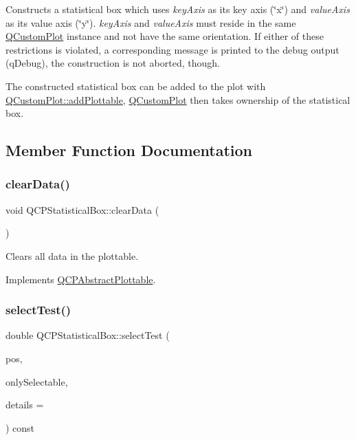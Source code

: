 Constructs a statistical box which uses {\itshape key\+Axis} as its key axis (\char`\"{}x\char`\"{}) and {\itshape value\+Axis} as its value axis (\char`\"{}y\char`\"{}). {\itshape key\+Axis} and {\itshape value\+Axis} must reside in the same \mbox{\hyperlink{class_q_custom_plot}{Q\+Custom\+Plot}} instance and not have the same orientation. If either of these restrictions is violated, a corresponding message is printed to the debug output (q\+Debug), the construction is not aborted, though.

The constructed statistical box can be added to the plot with \mbox{\hyperlink{class_q_custom_plot_ab7ad9174f701f9c6f64e378df77927a6}{Q\+Custom\+Plot\+::add\+Plottable}}, \mbox{\hyperlink{class_q_custom_plot}{Q\+Custom\+Plot}} then takes ownership of the statistical box. 

\subsection{Member Function Documentation}
\mbox{\label{class_q_c_p_statistical_box_a19112994449df0c20287858436cc68e3}} 
\subsubsection{\texorpdfstring{clear\+Data()}{clearData()}}
{\footnotesize\ttfamily void Q\+C\+P\+Statistical\+Box\+::clear\+Data (\begin{DoxyParamCaption}{ }\end{DoxyParamCaption})\hspace{0.3cm}{\ttfamily [virtual]}}

Clears all data in the plottable. 

Implements \mbox{\hyperlink{class_q_c_p_abstract_plottable_a86e5b8fd4b6ff4f4084e7ea4c573fc53}{Q\+C\+P\+Abstract\+Plottable}}.

\mbox{\label{class_q_c_p_statistical_box_a0153ac16326b94450afbca208e3f9961}} 
\subsubsection{\texorpdfstring{select\+Test()}{selectTest()}}
{\footnotesize\ttfamily double Q\+C\+P\+Statistical\+Box\+::select\+Test (\begin{DoxyParamCaption}\item[{const Q\+PointF \&}]{pos,  }\item[{bool}]{only\+Selectable,  }\item[{Q\+Variant $\ast$}]{details = {} }\end{DoxyParamCaption}) const\hspace{0.3cm}{\ttfamily [virtual]}}


